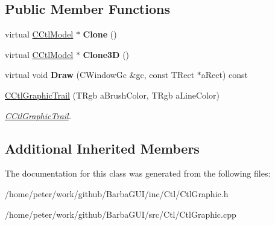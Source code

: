 \subsection*{Public Member Functions}
\begin{DoxyCompactItemize}
\item 
\mbox{\label{classCCtlGraphicTrail_a7f8ed409fd4c8027438fbd0ca5cba297}} 
virtual \hyperlink{classCCtlModel}{C\+Ctl\+Model} $\ast$ {\bfseries Clone} ()
\item 
\mbox{\label{classCCtlGraphicTrail_a4aba0b897053b0ffe46172d7370cacad}} 
virtual \hyperlink{classCCtlModel}{C\+Ctl\+Model} $\ast$ {\bfseries Clone3D} ()
\item 
\mbox{\label{classCCtlGraphicTrail_a742d5371a7ef9f1f88b03e77a8b5dc3a}} 
virtual void {\bfseries Draw} (C\+Window\+Gc \&gc, const T\+Rect $\ast$a\+Rect) const
\item 
\mbox{\label{classCCtlGraphicTrail_ad28ad0da08194efb9b310bcf3e5d94ac}} 
\hyperlink{classCCtlGraphicTrail_ad28ad0da08194efb9b310bcf3e5d94ac}{C\+Ctl\+Graphic\+Trail} (T\+Rgb a\+Brush\+Color, T\+Rgb a\+Line\+Color)
\begin{DoxyCompactList}\small\item\em \hyperlink{classCCtlGraphicTrail}{C\+Ctl\+Graphic\+Trail}. \end{DoxyCompactList}\end{DoxyCompactItemize}
\subsection*{Additional Inherited Members}


The documentation for this class was generated from the following files\+:\begin{DoxyCompactItemize}
\item 
/home/peter/work/github/\+Barba\+G\+U\+I/inc/\+Ctl/Ctl\+Graphic.\+h\item 
/home/peter/work/github/\+Barba\+G\+U\+I/src/\+Ctl/Ctl\+Graphic.\+cpp\end{DoxyCompactItemize}
